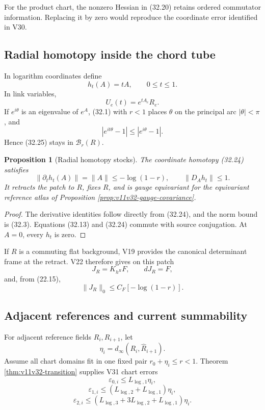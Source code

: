 \documentclass[11pt]{article}
\newtheorem{proposition}[theorem]{Proposition}
\begin{document}
For the product chart, the nonzero Hessian in (32.20) retains ordered
commutator information.  Replacing it by zero would reproduce the
coordinate error identified in V30.

\subsection{Radial homotopy inside the chord tube}

In logarithm coordinates define
\[
 h_t(A)=tA,\qquad0\leq t\leq1.
 \tag{32.24}
\]
In link variables,
\[
 U_e(t)=e^{tA_e}R_e.
 \tag{32.25}
\]
If \(e^{i\theta}\) is an eigenvalue of \(e^A\), (32.1) with \(r<1\)
places \(\theta\) on the principal arc \(|\theta|<\pi\), and
\[
 |e^{it\theta}-1|
 \leq|e^{i\theta}-1|.
 \tag{32.26}
\]
Hence (32.25) stays in \(\mathcal B_r(R)\).

\begin{proposition}[Radial homotopy stocks]
\label{prop:v11v32-radial}
The coordinate homotopy (32.24) satisfies
\[
 \|\partial_th_t(A)\|
 =\|A\|
 \leq-\log(1-r),
 \qquad
 \|D_Ah_t\|\leq1.
 \tag{32.27}
\]
It retracts the patch to \(R\), fixes \(R\), and is gauge equivariant
for the equivariant reference atlas of Proposition
\ref{prop:v11v32-gauge-covariance}.
\end{proposition}

\begin{proof}
The derivative identities follow directly from (32.24), and the norm
bound is (32.3).  Equations (32.13) and (32.24) commute with source
conjugation.  At \(A=0\), every \(h_t\) is zero.
\end{proof}

If \(R\) is a commuting flat background, V19 provides the canonical
determinant frame at the retract.  V22 therefore gives on this patch
\[
 J_R=K_{h^R}F,\qquad dJ_R=F,
 \tag{32.28}
\]
and, from (22.15),
\[
 \|J_R\|_0
 \leq C_F[-\log(1-r)].
 \tag{32.29}
\]

\subsection{Adjacent references and current summability}

For adjacent reference fields \(R_i,R_{i+1}\), let
\[
 \eta_i=d_\infty(R_i,\widehat R_{i+1}).
 \tag{32.30}
\]
Assume all chart domains fit in one fixed pair
\(r_0+\eta_i\leq r<1\).  Theorem
\ref{thm:v11v32-transition} supplies V31 chart errors
\[
 \varepsilon_{0,i}\leq L_{\log,1}\eta_i,
 \tag{32.31}
\]
\[
 \varepsilon_{1,i}
 \leq(L_{\log,2}+L_{\log,1})\eta_i,
 \tag{32.32}
\]
\[
 \varepsilon_{2,i}
 \leq(L_{\log,3}+3L_{\log,2}+L_{\log,1})\eta_i.
 \tag{32.33}
\]
\end{document}
